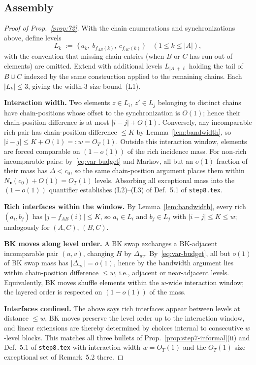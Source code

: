 \subsection{Assembly}

\begin{proof}[Proof of Prop.~\ref{prop:72}]
With the chain enumerations and synchronizations above, define levels
\[
  L_k \;:=\; \{\,a_k,\ b_{f_{AB}(k)},\ c_{f_{AC}(k)}\,\}\quad (1\le k\le|A|),
\]
with the convention that missing chain-entries (when $B$ or $C$ has
run out of elements) are omitted.  Extend with additional levels
$L_{|A|+\ell}$ holding the tail of $B\cup C$ indexed by the same
construction applied to the remaining chains.  Each $|L_k|\le 3$,
giving the width-$3$ size bound~(L1).

\textbf{Interaction width.}  Two elements $z\in L_i$, $z'\in L_j$
belonging to distinct chains have chain-positions whose offset to the
synchronization is $O(1)$; hence their chain-position difference is
at most $|i-j|+O(1)$.  Conversely, any incomparable rich pair has
chain-position difference $\le K$ by Lemma~\ref{lem:bandwidth}, so
$|i-j|\le K+O(1)=:w=O_T(1)$.  Outside this interaction window,
elements are forced comparable on $(1-o(1))$ of the rich incidence
mass.  For non-rich incomparable pairs: by~\eqref{eq:var-budget} and
Markov, all but an $o(1)$ fraction of their mass has $\Delta<c_0$, so
the same chain-position argument places them within
$N_\bullet(c_0)+O(1)=O_T(1)$ levels.  Absorbing all exceptional mass
into the $(1-o(1))$ quantifier establishes (L2)--(L3) of
Def.~5.1 of \texttt{step8.tex}.

\textbf{Rich interfaces within the window.}  By
Lemma~\ref{lem:bandwidth}, every rich $(a_i,b_j)$ has
$|j-f_{AB}(i)|\le K$, so $a_i\in L_i$ and $b_j\in L_j$ with
$|i-j|\le K\le w$; analogously for $(A,C)$, $(B,C)$.

\textbf{BK moves along level order.}  A BK swap exchanges a
BK-adjacent incomparable pair $(u,v)$, changing $H$ by $\Delta_{uv}$.
By~\eqref{eq:var-budget}, all but $o(1)$ of BK swap mass has
$|\Delta_{uv}|=o(1)$, hence by the bandwidth argument lies within
chain-position difference $\le w$, i.e., adjacent or near-adjacent
levels.  Equivalently, BK moves shuffle elements within the
$w$-wide interaction window; the layered order is respected on
$(1-o(1))$ of the mass.

\textbf{Interfaces confined.}  The above says rich interfaces
appear between levels at distance $\le w$, BK moves preserve the
level order up to the interaction window, and linear extensions are
thereby determined by choices internal to consecutive $w$-level
blocks.  This matches all three bullets of Prop.~\ref{prop:step7-informal}(ii)
and Def.~5.1 of \texttt{step8.tex} with interaction width $w=O_T(1)$
and the $O_T(1)$-size exceptional set of
Remark~5.2 there.
\end{proof}

